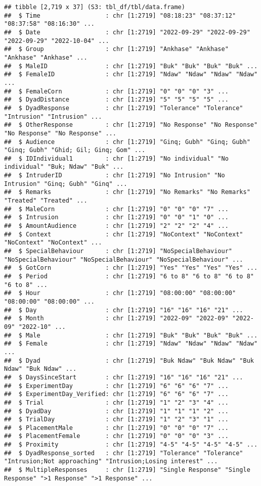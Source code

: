 \documentclass[
]{article}
\begin{document}
\begin{verbatim}
## tibble [2,719 x 37] (S3: tbl_df/tbl/data.frame)
##  $ Time                  : chr [1:2719] "08:18:23" "08:37:12" "08:37:58" "08:16:30" ...
##  $ Date                  : chr [1:2719] "2022-09-29" "2022-09-29" "2022-09-29" "2022-10-04" ...
##  $ Group                 : chr [1:2719] "Ankhase" "Ankhase" "Ankhase" "Ankhase" ...
##  $ MaleID                : chr [1:2719] "Buk" "Buk" "Buk" "Buk" ...
##  $ FemaleID              : chr [1:2719] "Ndaw" "Ndaw" "Ndaw" "Ndaw" ...
##  $ FemaleCorn            : chr [1:2719] "0" "0" "0" "3" ...
##  $ DyadDistance          : chr [1:2719] "5" "5" "5" "5" ...
##  $ DyadResponse          : chr [1:2719] "Tolerance" "Tolerance" "Intrusion" "Intrusion" ...
##  $ OtherResponse         : chr [1:2719] "No Response" "No Response" "No Response" "No Response" ...
##  $ Audience              : chr [1:2719] "Ginq; Gubh" "Ginq; Gubh" "Ginq; Gubh" "Ghid; Gil; Ginq; Gom" ...
##  $ IDIndividual1         : chr [1:2719] "No individual" "No individual" "Buk; Ndaw" "Buk" ...
##  $ IntruderID            : chr [1:2719] "No Intrusion" "No Intrusion" "Ginq; Gubh" "Ginq" ...
##  $ Remarks               : chr [1:2719] "No Remarks" "No Remarks" "Treated" "Treated" ...
##  $ MaleCorn              : chr [1:2719] "0" "0" "0" "7" ...
##  $ Intrusion             : chr [1:2719] "0" "0" "1" "0" ...
##  $ AmountAudience        : chr [1:2719] "2" "2" "2" "4" ...
##  $ Context               : chr [1:2719] "NoContext" "NoContext" "NoContext" "NoContext" ...
##  $ SpecialBehaviour      : chr [1:2719] "NoSpecialBehaviour" "NoSpecialBehaviour" "NoSpecialBehaviour" "NoSpecialBehaviour" ...
##  $ GotCorn               : chr [1:2719] "Yes" "Yes" "Yes" "Yes" ...
##  $ Period                : chr [1:2719] "6 to 8" "6 to 8" "6 to 8" "6 to 8" ...
##  $ Hour                  : chr [1:2719] "08:00:00" "08:00:00" "08:00:00" "08:00:00" ...
##  $ Day                   : chr [1:2719] "16" "16" "16" "21" ...
##  $ Month                 : chr [1:2719] "2022-09" "2022-09" "2022-09" "2022-10" ...
##  $ Male                  : chr [1:2719] "Buk" "Buk" "Buk" "Buk" ...
##  $ Female                : chr [1:2719] "Ndaw" "Ndaw" "Ndaw" "Ndaw" ...
##  $ Dyad                  : chr [1:2719] "Buk Ndaw" "Buk Ndaw" "Buk Ndaw" "Buk Ndaw" ...
##  $ DaysSinceStart        : chr [1:2719] "16" "16" "16" "21" ...
##  $ ExperimentDay         : chr [1:2719] "6" "6" "6" "7" ...
##  $ ExperimentDay_Verified: chr [1:2719] "6" "6" "6" "7" ...
##  $ Trial                 : chr [1:2719] "1" "2" "3" "4" ...
##  $ DyadDay               : chr [1:2719] "1" "1" "1" "2" ...
##  $ TrialDay              : chr [1:2719] "1" "2" "3" "1" ...
##  $ PlacementMale         : chr [1:2719] "0" "0" "0" "7" ...
##  $ PlacementFemale       : chr [1:2719] "0" "0" "0" "3" ...
##  $ Proximity             : chr [1:2719] "4-5" "4-5" "4-5" "4-5" ...
##  $ DyadResponse_sorted   : chr [1:2719] "Tolerance" "Tolerance" "Intrusion;Not approaching" "Intrusion;Losing interest" ...
##  $ MultipleResponses     : chr [1:2719] "Single Response" "Single Response" ">1 Response" ">1 Response" ...
\end{verbatim}
\end{document}
